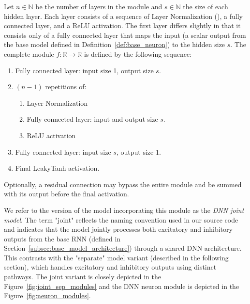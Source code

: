 \begin{defn}
    Let $n \in \mathbb{N}$ be the number of layers in the module and $s \in \mathbb{N}$ the size of each hidden layer. Each layer consists of a sequence of Layer Normalization (\citet{ba2016layernormalization}), a fully connected layer, and a ReLU activation. The first layer differs slightly in that it consists only of a fully connected layer that maps the input (a scalar output from the base model defined in Definition~\ref{def:base_neuron}) to the hidden size $s$. The complete module $f: \mathbb{R} \to \mathbb{R}$ is defined by the following sequence:
    
    \begin{enumerate}
        \item Fully connected layer: input size 1, output size $s$.
        \item $(n-1)$ repetitions of:
        \begin{enumerate}
            \item Layer Normalization
            \item Fully connected layer: input and output size $s$.
            \item ReLU activation
        \end{enumerate}
        \item Fully connected layer: input size $s$, output size 1.
        \item Final LeakyTanh activation.
    \end{enumerate}
    
    Optionally, a residual connection may bypass the entire module and be summed with its output before the final activation.
\end{defn}
\label{def:dnn_joint}

We refer to the version of the model incorporating this module as the \emph{DNN joint model}. The term "joint" reflects the naming convention used in our source code and indicates that the model jointly processes both excitatory and inhibitory outputs from the base RNN (defined in Section~\ref{subsec:base_model_architecture}) through a shared DNN architecture. This contrasts with the "separate" model variant (described in the following section), which handles excitatory and inhibitory outputs using distinct pathways.
The joint variant is closely depicted in the Figure~\ref{fig:joint_sep_modules} and the DNN neuron module is depicted in the Figure~\ref{fig:neuron_modules}.

